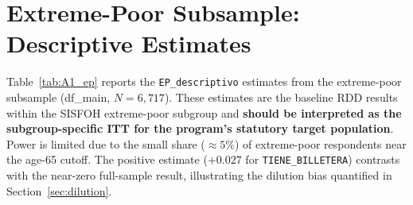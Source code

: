 \documentclass[12pt]{article}
\begin{document}
\clearpage
\appendix

\section{Extreme-Poor Subsample: Descriptive Estimates}
\label{sec:appendix_ep}

Table~\ref{tab:A1_ep} reports the \texttt{EP\_descriptivo} estimates from
the extreme-poor subsample (df\_main, $N=6{,}717$). These estimates are the
baseline RDD results within the SISFOH extreme-poor subgroup and
\textbf{should be interpreted as the subgroup-specific ITT for the
program's statutory target population}. Power is limited due to the small
share ($\approx\!5\%$) of extreme-poor respondents near the age-65 cutoff.
The positive estimate ($+0.027$ for \texttt{TIENE\_BILLETERA}) contrasts
with the near-zero full-sample result, illustrating the dilution bias
quantified in Section~\ref{sec:dilution}.

\begin{table}[H]
\centering
\caption{Extreme-Poor Subsample: Baseline RDD Estimates (Appendix)}
\label{tab:A1_ep}

\end{table}


\clearpage
\end{document}

